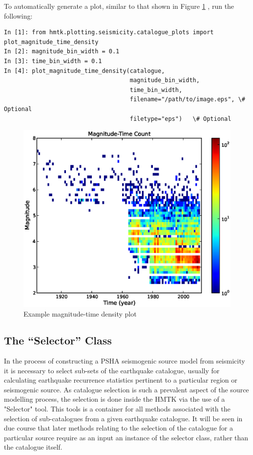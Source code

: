 \begin{itemize}
To automatically generate a plot, similar to that shown in Figure \ref{fig:mag_time_density} , run the following:

\begin{Verbatim}[frame=single, commandchars=\\\{\}, fontsize=\scriptsize, samepage=true]
In [1]: from hmtk.plotting.seismicity.catalogue_plots import plot_magnitude_time_density
In [2]: magnitude_bin_width = 0.1
In [3]: time_bin_width = 0.1 
In [4]: plot_magnitude_time_density(catalogue,
                                    magnitude_bin_width,
                                    time_bin_width,
                                    filename="/path/to/image.eps", \# Optional
                                    filetype="eps")   \# Optional
\end{Verbatim}

\begin{figure}[htb]
  \centering
      \includegraphics[trim=10mm 8mm 10mm 10mm, clip, width=12cm]{./figures/magnitude_time_density.eps}
  \caption{Example magnitude-time density plot}
  \label{fig:mag_time_density}
\end{figure}
\end{itemize}

\subsection{The ``Selector'' Class}

In the process of constructing a PSHA seismogenic source model from seismicity it is necessary to select sub-sets of the earthquake catalogue, usually for calculating earthquake recurrence statistics pertinent to a particular region or seismogenic source. As catalogue selection is such a prevalent aspect of the source modelling process, the selection is done inside the HMTK via the use of a "Selector" tool. This tools is a container for all methods associated with the selection of sub-catalogues from a given earthquake catalogue. It will be seen in due course that later methods relating to the selection of the catalogue for a particular source require as an input an instance of the selector class, rather than the catalogue itself.

